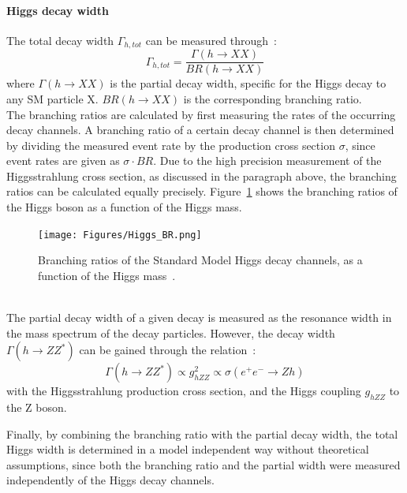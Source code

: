 \paragraph{Higgs decay width}
The total decay width $\Gamma_{h,tot}$ can be measured through~\cite[p. 14]{PhysicsCase}:
\begin{equation}
 \Gamma_{h,tot}=\frac{\Gamma(h\rightarrow XX)}{BR(h\rightarrow XX)}
\end{equation}
where $\Gamma(h\rightarrow XX)$ is the partial decay width, specific for the Higgs decay to any SM particle X.
$BR(h\rightarrow XX)$ is the corresponding branching ratio.\\
The branching ratios are calculated by first measuring the rates of the occurring decay channels.
A branching ratio of a certain decay channel is then determined by dividing the measured event rate by the production cross section $\sigma$, since event rates are given as $\sigma\cdot BR$.
Due to the high precision measurement of the Higgsstrahlung cross section, as discussed in the paragraph above, the branching ratios can be calculated equally precisely.
Figure~\ref{fig:HiggsBR} shows the branching ratios of the Higgs boson as a function of the Higgs mass.
\begin{figure}
\centering
\texttt{[image: Figures/Higgs\_BR.png]}
\caption[Plot of the Higgs decay branching ratios as a function of the Higgs mass]{Branching ratios of the Standard Model Higgs decay channels, as a function of the Higgs mass~\cite[p. 15]{TDR2}.}
\label{fig:HiggsBR}
\end{figure}
\\The partial decay width of a given decay is measured as the resonance width in the mass spectrum of the decay particles.
However, the decay width $\Gamma(h\rightarrow ZZ^*)$ can be gained through the relation~\cite[p. 14]{PhysicsCase}:
\begin{equation}
 \Gamma(h\rightarrow ZZ^*)\propto g^2_{hZZ} \propto \sigma(e^+e^-\rightarrow Zh)
\end{equation}
with the Higgsstrahlung production cross section, and the Higgs coupling $g_{hZZ}$ to the Z boson. 

Finally, by combining the branching ratio with the partial decay width, the total Higgs width is determined in a model independent way without theoretical assumptions, since both the branching ratio and the partial width were measured independently of the Higgs decay channels.

